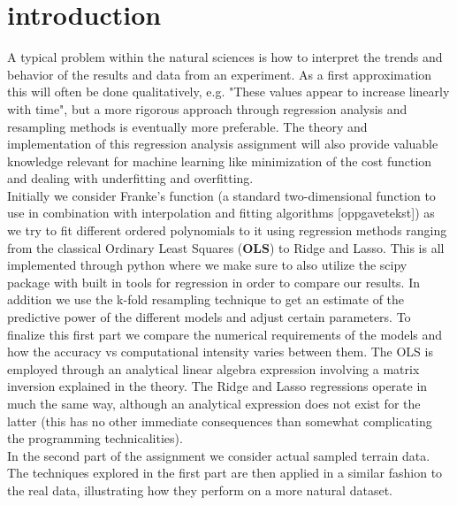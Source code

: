 \section{introduction}
A typical problem within the natural sciences is how to interpret the trends and behavior of the results and data from an experiment. As a first approximation this will often be done qualitatively, e.g. "These values appear to increase linearly with time", but a more rigorous approach through regression analysis and resampling methods is eventually more preferable. The theory and implementation of this regression analysis assignment will also provide valuable knowledge relevant for machine learning like minimization of the cost function and dealing with underfitting and overfitting.\\
Initially we consider Franke's function (a standard two-dimensional function to use in combination with interpolation and fitting algorithms [oppgavetekst]) as we try to fit different ordered polynomials to it using regression methods ranging from the classical Ordinary Least Squares (\textbf{OLS}) to Ridge and Lasso. This is all implemented through python where we make sure to also utilize the scipy package with built in tools for regression in order to compare our results. In addition we use the k-fold resampling technique to get an estimate of the predictive power of the different models and adjust certain parameters. To finalize this first part we compare the numerical requirements of the models and how the accuracy vs computational intensity varies between them. The OLS is employed through an analytical linear algebra expression involving a matrix inversion explained in the theory. The Ridge and Lasso regressions operate in much the same way, although an analytical expression does not exist for the latter (this has no other immediate consequences than somewhat complicating the programming technicalities).\\
In the second part of the assignment we consider actual sampled terrain data. The techniques explored in the first part are then applied in a similar fashion to the real data, illustrating how they perform on a more natural dataset.